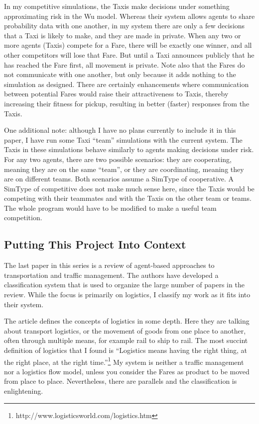 \documentclass[11pt,letterpaper,onecolumn,twoside,openright,draft]{report}
\begin{document}
In my competitive simulations, the Taxis make decisions under something approximating risk in the Wu model.
Whereas their system allows agents to share probability data with one another, in my system there are only a few decisions that a Taxi is likely to make, and they are made in private.
When any two or more agents (Taxis) compete for a Fare, there will be exactly one winner, and all other competitors will lose that Fare.
But until a Taxi announces publicly that he has reached the Fare first, all movement is private.
Note also that the Fares do not communicate with one another, but only because it adds nothing to the simulation as designed.
There are certainly enhancements where communication between potential Fares would raise their attractiveness to Taxis, thereby increasing their fitness for pickup, resulting in better (faster) responses from the Taxis.

One additional note: although I have no plans currently to include it in this paper, I have run some Taxi ``team'' simulations with the current system.
The Taxis in these simulations behave similarly to agents making decisions under risk.
For any two agents, there are two possible scenarios: they are cooperating, meaning they are on the same ``team'', or they are coordinating, meaning they are on different teams.
Both scenarios assume a SimType of cooperative.
A SimType of competitive does not make much sense here, since the Taxis would be competing with their teammates and with the Taxis on the other team or teams.
The whole program would have to be modified to make a useful team competition.

\subsection{Putting This Project Into Context}
The last paper in this series is a review of agent-based approaches to transportation and traffic management.
The authors have developed a classification system that is used to organize the large number of papers in the review.
While the focus is primarily on logistics, I classify my work as it fits into their system.

The article defines the concepts of logistics in some depth.
Here they are talking about transport logistics, or the movement of goods from one place to another, often through multiple means, for example rail to ship to rail.
The most succint definition of logistics that I found is ``Logistics means having the right thing, at the right place, at the right time.''\footnote{http://www.logisticsworld.com/logistics.htm}
My system is neither a traffic management nor a logistics flow model, unless you consider the Fares as product to be moved from place to place.
Nevertheless, there are parallels and the classification is enlightening.
\end{document}
